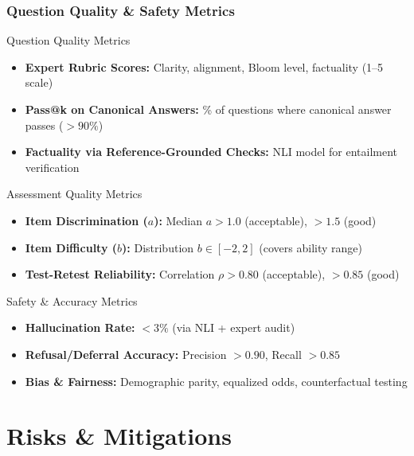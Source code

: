 \documentclass[aspectratio=169]{beamer}
\begin{document}
\begin{frame}
\frametitle{Question Quality \& Safety Metrics}
\begin{block}{Question Quality Metrics}
\begin{itemize}
\item \textbf{Expert Rubric Scores:} Clarity, alignment, Bloom level, factuality (1--5 scale)
\item \textbf{Pass@k on Canonical Answers:} \% of questions where canonical answer passes ($> 90\%$)
\item \textbf{Factuality via Reference-Grounded Checks:} NLI model for entailment verification
\end{itemize}
\end{block}

\begin{block}{Assessment Quality Metrics}
\begin{itemize}
\item \textbf{Item Discrimination ($a$):} Median $a > 1.0$ (acceptable), $> 1.5$ (good)
\item \textbf{Item Difficulty ($b$):} Distribution $b \in [-2, 2]$ (covers ability range)
\item \textbf{Test-Retest Reliability:} Correlation $\rho > 0.80$ (acceptable), $> 0.85$ (good)
\end{itemize}
\end{block}

\begin{block}{Safety \& Accuracy Metrics}
\begin{itemize}
\item \textbf{Hallucination Rate:} $< 3\%$ (via NLI + expert audit)
\item \textbf{Refusal/Deferral Accuracy:} Precision $> 0.90$, Recall $> 0.85$
\item \textbf{Bias \& Fairness:} Demographic parity, equalized odds, counterfactual testing
\end{itemize}
\end{block}
\end{frame}

\section{Risks \& Mitigations}
\end{document}
